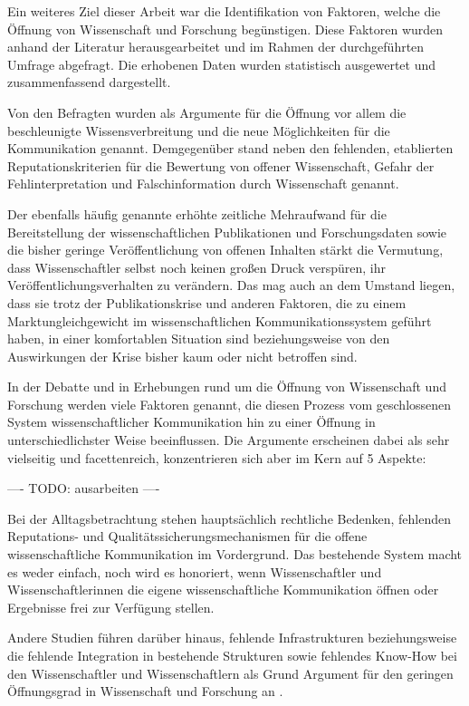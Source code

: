 Ein weiteres Ziel dieser Arbeit war die Identifikation von Faktoren, welche die Öffnung von Wissenschaft und Forschung begünstigen. Diese Faktoren wurden anhand der Literatur herausgearbeitet und im Rahmen der durchgeführten Umfrage abgefragt. Die erhobenen Daten wurden statistisch ausgewertet und zusammenfassend dargestellt.

Von den Befragten wurden als Argumente für die Öffnung vor allem die beschleunigte Wissensverbreitung und die neue Möglichkeiten für die Kommunikation genannt. Demgegenüber stand neben den fehlenden, etablierten Reputationskriterien für die Bewertung von offener Wissenschaft, Gefahr der Fehlinterpretation und Falschinformation durch Wissenschaft genannt.

Der ebenfalls häufig genannte erhöhte zeitliche Mehraufwand für die Bereitstellung der wissenschaftlichen Publikationen und Forschungsdaten sowie die bisher geringe Veröffentlichung von offenen Inhalten stärkt die Vermutung, dass Wissenschaftler selbst noch keinen großen Druck verspüren, ihr Veröffentlichungsverhalten zu verändern. Das mag auch an dem Umstand liegen, dass sie trotz der Publikationskrise und anderen Faktoren, die zu einem Marktungleichgewicht im wissenschaftlichen Kommunikationssystem geführt haben, in einer komfortablen Situation sind beziehungsweise von den Auswirkungen der Krise bisher kaum oder nicht betroffen sind.

In der Debatte und in Erhebungen rund um die Öffnung von Wissenschaft und Forschung werden viele Faktoren genannt, die diesen Prozess vom geschlossenen System wissenschaftlicher Kommunikation hin zu einer Öffnung in unterschiedlichster Weise beeinflussen. Die Argumente erscheinen dabei als sehr vielseitig und facettenreich, konzentrieren sich aber im Kern auf 5 Aspekte:

---- TODO: ausarbeiten ----

Bei der Alltagsbetrachtung stehen hauptsächlich rechtliche Bedenken, fehlenden Reputations- und Qualitätssicherungsmechanismen für die offene wissenschaftliche Kommunikation im Vordergrund. Das bestehende System macht es weder einfach, noch wird es honoriert, wenn Wissenschaftler und Wissenschaftlerinnen die eigene wissenschaftliche Kommunikation öffnen oder Ergebnisse frei zur Verfügung stellen.

Andere Studien führen darüber hinaus, fehlende Infrastrukturen beziehungsweise die fehlende Integration in bestehende Strukturen sowie fehlendes Know-How bei den Wissenschaftler und Wissenschaftlern als Grund Argument für den geringen Öffnungsgrad in Wissenschaft und Forschung an \cite{eu_open_science_2015}.

